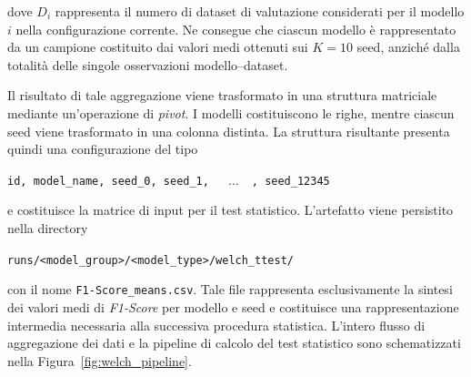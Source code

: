 dove $D_i$ rappresenta il numero di dataset di valutazione considerati per il modello $i$ nella configurazione corrente. 
Ne consegue che ciascun modello è rappresentato da un campione costituito dai valori medi ottenuti sui $K=10$ seed, anziché dalla totalità delle singole osservazioni modello--dataset.

Il risultato di tale aggregazione viene trasformato in una struttura matriciale mediante un'operazione di \textit{pivot}. 
I modelli costituiscono le righe, mentre ciascun seed viene trasformato in una colonna distinta. La struttura risultante presenta quindi una configurazione del tipo

\begin{center}
    \texttt{id, model\_name, seed\_0, seed\_1, $\quad \ldots \quad$, seed\_12345}
\end{center}

e costituisce la matrice di input per il test statistico. 
L'artefatto viene persistito nella directory

\begin{center}
    \texttt{runs/<model\_group>/<model\_type>/welch\_ttest/}
\end{center}

con il nome \texttt{F1-Score\_means.csv}. 
Tale file rappresenta esclusivamente la sintesi dei valori medi di \textit{F1-Score} per modello e seed e costituisce una rappresentazione intermedia necessaria alla successiva procedura statistica. 
L'intero flusso di aggregazione dei dati e la pipeline di calcolo del test statistico sono schematizzati nella Figura~\ref{fig:welch_pipeline}.

